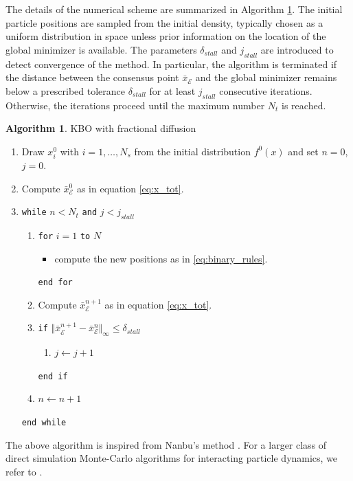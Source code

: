 \documentclass[11pt,handout]{article}%
\numberwithin{equation}{section}
\theoremstyle{definition}
\newtheorem{algorithm}{Algorithm}[section]
\begin{document}
The details of the numerical scheme are summarized in Algorithm \ref{alg:KBO}. The initial particle positions are sampled from the initial density, typically chosen as a uniform distribution in space unless prior information on the location of the global minimizer is available. The parameters $\delta_{stall}$ and $j_{stall}$ are introduced to detect convergence of the method. In particular, the algorithm is terminated if the distance between the consensus point $\bar{x}_\mathcal{E}$ and the global minimizer remains below a prescribed tolerance $\delta_{stall}$ for at least $j_{stall}$ consecutive iterations. Otherwise, the iterations proceed until the maximum number $N_t$ is reached.
\\
\begin{algorithm}{KBO with fractional diffusion}\label{alg:KBO}
	\begin{enumerate}
		\item[\texttt 1.] Draw $x_i^0$ with $i=1,\dots,N_s$ from the initial distribution $f^0(x)$ and set $n=0$, $j=0$.
		\item[\texttt 2.] Compute $\bar{x}_\mathcal{E}^0$ as in equation \eqref{eq:x_tot}.
		\item[\texttt 3.] \texttt{while} $n<N_t$ \texttt{and} $j<j_{stall}$
		\begin{enumerate}
			\item \texttt{for} $i=1$ \texttt{to}  $N$
			\begin{itemize}
				\item [] compute the new positions as in \eqref{eq:binary_rules}.
			\end{itemize}
			\texttt{end for}
			\item Compute $\bar{x}_\mathcal{E}^{n+1}$ as in equation \eqref{eq:x_tot}.
			\item  \texttt{if} $\Vert \bar{x}_\mathcal{E}^{n+1}-\bar{x}_\mathcal{E}^n\Vert_\infty\leq \delta_{stall}$
			\begin{enumerate}
				\item [] $j\leftarrow j+1$
			\end{enumerate}
			\texttt{end if} 
			\item [] $n\leftarrow n+1$
		\end{enumerate}
		\texttt{end while} 
	\end{enumerate}
\end{algorithm}
The above algorithm is inspired from Nanbu's method \cite{nanbu1980direct}. For a larger class of direct simulation Monte-Carlo algorithms for interacting particle dynamics, we refer to \cite{albi2013binary, pareschi2013interacting}. 
\end{document}
